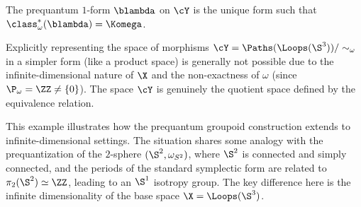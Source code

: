 \begin{article}
    The prequantum $1$-form $\blambda$ on $\cY$ is the unique form such that $\class_\omega^*(\blambda) = \Komega$.
    
    Explicitly representing the space of morphisms $\cY = \Paths(\Loops(\S^3)) / \sim_\omega$ in a simpler form (like a product space) is generally not possible due to the infinite-dimensional nature of $\X$ and the non-exactness of $\omega$ (since $\P_\omega = \ZZ \neq \{0\}$).
    The space $\cY$ is genuinely the quotient space defined by the equivalence relation.
    
    This example illustrates how the prequantum groupoid construction extends to infinite-dimensional settings.
    The situation shares some analogy with the prequantization of the $2$-sphere $(\S^2, \omega_{S^2})$,
    where $\S^2$ is connected and simply connected,
    and the periods of the standard symplectic form are related to $\pi_2(\S^2) \simeq \ZZ$,
    leading to an $\S^1$ isotropy group.
    The key difference here is the infinite dimensionality of the base space $\X = \Loops(\S^3)$.
    
  \end{article}
  
  
